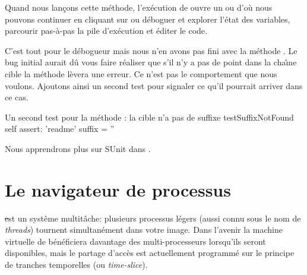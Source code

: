 \documentclass[a4paper,10pt,twoside]{book}
\begin{document}
Quand nous lan\c{c}ons cette m\'ethode, l'ex\'ecution de  ouvre un  ou \emph{} d'o\`u nous pouvons continuer 
en cliquant sur 
ou d\'eboguer et explorer l'\'etat des variables, parcourir pas-\`a-pas la pile d'ex\'ecution et \'editer le code.

C'est tout pour le d\'ebogueur mais nous n'en avons pas fini avec la m\'ethode .
Le bug initial aurait d\^u vous faire r\'ealiser que s'il n'y a pas de point dans la cha\^{\i}ne cible la m\'ethode  l\`evera une erreur.
Ce n'est pas le comportement que nous voulons. Ajoutons ainsi un second test
pour signaler ce qu'il pourrait arriver dans ce cas.  

\begin{method}[testNoSuffix]{Un second test pour la m\'ethode : la cible n'a pas de suffixe}
testSuffixNotFound
	self assert: 'readme' suffix = ''
\end{method}



Nous apprendrons plus sur SUnit dans .


\section{Le navigateur de processus}

\st est un syst\^eme multit\^ache: plusieurs processus l\'egers (aussi
connu sous le nom de \emph{threads}) tournent simultan\'ement dans
votre image.
Dans l'avenir la machine virtuelle de \sq b\'en\'eficiera davantage
des multi-processeurs lorsqu'ils seront disponibles, mais le partage
d'acc\`es est actuellement programm\'e sur le principe de
 tranches temporelles (ou \emph{time-slice}).
\end{document}
